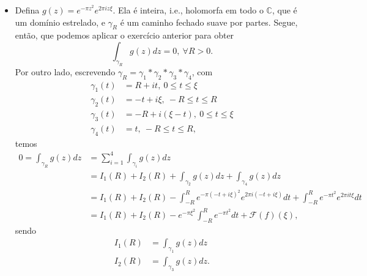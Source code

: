 \documentclass[12pt,a4paper]{article}
\begin{document}
\begin{enumerate}
\begin{itemize}
			\item Defina $g(z) = e^{-\pi z^2}e^{2\pi i z\xi}$. Ela é inteira, i.e., holomorfa em todo o $\mathbb{C}$, que é um domínio estrelado, e $\gamma_R$ é um caminho fechado suave por partes. Segue, então, que podemos aplicar o exercício anterior para obter
			$$
			\int_{\gamma_R} g(z)dz = 0, \ \forall R>0.
			$$
			Por outro lado, escrevendo $\gamma_R = \gamma_1*\gamma_2*\gamma_3*\gamma_4$, com
			\begin{align*}
			\gamma_1(t) &= R+it, \ 0\leq t\leq \xi \\ 
			\gamma_2(t) &= -t+i\xi, \ -R\leq t\leq R \\
			\gamma_3(t) &= -R+i(\xi - t), \ 0\leq t\leq \xi \\
			\gamma_4(t) &= t, \ -R\leq t\leq R,
			\end{align*}
			temos
			\begin{align*}
			0 = \int_{\gamma_R}g(z)dz &= \sum_{i=1}^{4}\int_{\gamma_i}g(z)dz \\
			&= I_1(R) + I_2(R) + \int_{\gamma_2}g(z)dz + \int_{\gamma_4}g(z)dz \\
			&= I_1(R) + I_2(R) - \int_{-R}^{R}e^{-\pi (-t+i\xi)^2}e^{2\pi i(-t+i\xi)}dt  + \int_{-R}^{R}e^{-\pi t^2}e^{2\pi it\xi}  dt \\
			&= I_1(R) + I_2(R) - e^{-\pi\xi^2}\int_{-R}^{R}e^{-\pi t^2}dt + \mathcal{F}(f)(\xi),
			\end{align*}
			sendo
			\begin{align*}
			I_1(R) &= \int_{\gamma_1} g(z)dz \\
			I_2(R) &= \int_{\gamma_3} g(z)dz.
			\end{align*}
			

\end{itemize}
\end{enumerate}
\end{document}
